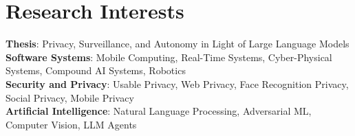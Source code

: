 \section{Research Interests}
 \begin{itemize}[leftmargin=0.5cm, label={}]
    \small{\item{
     \textbf{Thesis}{: Privacy, Surveillance, and Autonomy in Light of Large Language Models} \\
     \textbf{Software Systems}{: Mobile Computing, Real-Time Systems, Cyber-Physical Systems, Compound AI Systems, Robotics} \\
     \textbf{Security and Privacy}{: Usable Privacy, Web Privacy, Face Recognition Privacy, Social Privacy, Mobile Privacy} \\
     \textbf{Artificial Intelligence}{: Natural Language Processing, Adversarial ML, Computer Vision, LLM Agents} \\
    }}
 \end{itemize}